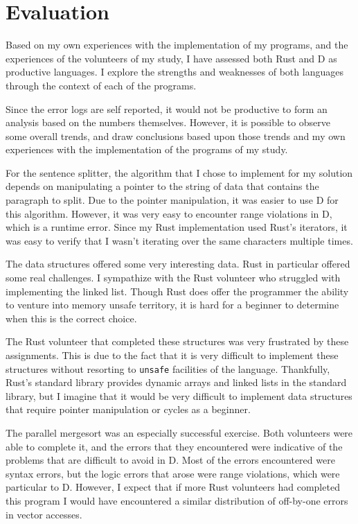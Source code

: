 \documentclass[finalcopy]{srpaper}
\begin{document}
\section{Evaluation}

Based on my own experiences with the implementation of my programs, and the
experiences of the volunteers of my study, I have assessed both Rust and D as
productive languages. I explore the strengths and weaknesses of both languages
through the context of each of the programs.

Since the error logs are self reported, it would not be productive to form an
analysis based on the numbers themselves. However, it is possible to observe
some overall trends, and draw conclusions based upon those trends and my own
experiences with the implementation of the programs of my study.

For the sentence splitter, the algorithm that I chose to implement for my
solution depends on manipulating a pointer to the string of data that contains
the paragraph to split. Due to the pointer manipulation, it was easier to use D
for this algorithm. However, it was very easy to encounter range violations in
D, which is a runtime error. Since my Rust implementation used Rust's
iterators, it was easy to verify that I wasn't iterating over the same
characters multiple times.

The data structures offered some very interesting data. Rust in particular
offered some real challenges. I sympathize with the Rust volunteer who
struggled with implementing the linked list. Though Rust does offer the
programmer the ability to venture into memory unsafe territory, it is hard for
a beginner to determine when this is the correct choice.

The Rust volunteer that completed these structures was very frustrated by these
assignments. This is due to the fact that it is very difficult to implement
these structures without resorting to \texttt{unsafe} facilities of the
language. Thankfully, Rust's standard library provides dynamic arrays and
linked lists in the standard library, but I imagine that it would be very
difficult to implement data structures that require pointer manipulation or
cycles as a beginner.

The parallel mergesort was an especially successful exercise. Both volunteers
were able to complete it, and the errors that they encountered were indicative
of the problems that are difficult to avoid in D. Most of the errors
encountered were syntax errors, but the logic errors that arose were range
violations, which were particular to D. However, I expect that if more Rust
volunteers had completed this program I would have encountered a similar
distribution of off-by-one errors in vector accesses.
\end{document}
